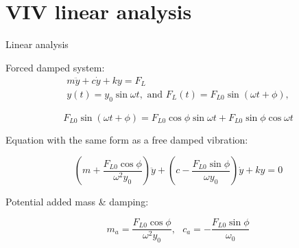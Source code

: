 \documentclass[9pt, xcolor=table]{beamer}
\begin{document}
\section{VIV linear analysis}
\begin{frame}{Linear analysis}	
	\setlength{\parindent}{2em}

	Forced damped system:
	\begin{equation}
		\begin{gathered}
		m \ddot{y}+c \dot{y}+k y=F_{L} \\
		y(t)=y_{0} \sin \omega t, \text { and }
		F_{L}(t)=F_{L 0} \sin (\omega t+\phi),
		\end{gathered}
	\end{equation}

	\vspace{0.5em}

	\begin{equation}
		F_{L 0} \sin (\omega t+\phi)=F_{L 0} \cos \phi \sin \omega t+F_{L 0} \sin \phi \cos \omega t
	\end{equation}

	\vspace{0.5em}

	Equation with the same form as a free damped vibration:

	\begin{equation}
		\left(m+\frac{F_{L 0} \cos \phi}{\omega^{2} y_{0}}\right) \ddot{y}+\left(c-\frac{F_{L 0} \sin \phi}{\omega y_{0}}\right) \dot{y}+k y=0
	\end{equation}

	Potential added mass \& damping:

	\begin{equation}
		m_{a}=\frac{F_{L 0} \cos \phi}{\omega^{2} y_{0}}, \text {   } c_{a}=-\frac{F_{L 0} \sin \phi}{\omega_{0}}
	\end{equation}



\end{frame}
%
\end{document}
